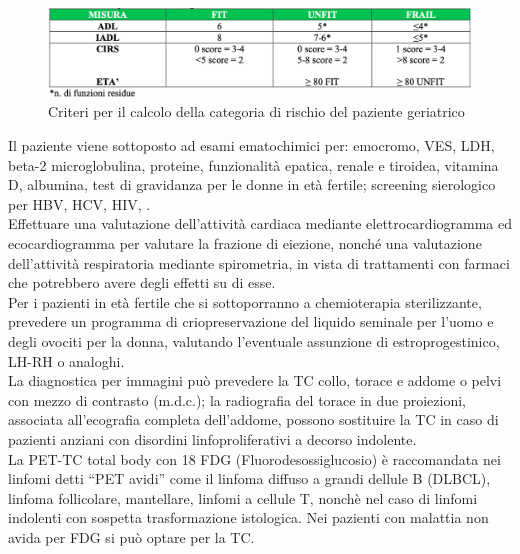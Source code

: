 \begin{figure}[H]
    \begin{center}
    \includegraphics[width=0.9\columnwidth]{img/FIT-UNFIT-FRAIL.png}
    \vspace{-3mm}
    \end{center}
    \caption{Criteri per il calcolo della categoria di rischio del paziente geriatrico
    \cite{AIOM}}

\end{figure}

Il paziente viene sottoposto ad esami ematochimici per: emocromo, VES, LDH, beta-2 microglobulina, proteine, 
funzionalità epatica, renale e tiroidea, vitamina D, albumina, test di gravidanza per le donne in età fertile; 
screening sierologico per HBV, HCV, HIV\cite{AIOM}, \cite{reteveneta}.\\
Effettuare una valutazione dell’attività cardiaca mediante elettrocardiogramma ed ecocardiogramma per valutare 
la frazione di eiezione, nonché una valutazione dell’attività respiratoria mediante spirometria, in vista di 
trattamenti con farmaci che potrebbero avere degli effetti su di esse\cite{AIOM}.\\ 
Per i pazienti in età fertile che si sottoporranno a chemioterapia sterilizzante, prevedere un programma di 
criopreservazione del liquido seminale per l’uomo e degli ovociti per la donna, valutando l’eventuale assunzione di 
estroprogestinico, LH-RH o analoghi\cite{AIOM}.\\

La diagnostica per immagini può prevedere la TC collo, torace e addome o pelvi con mezzo di contrasto (m.d.c.); 
la radiografia del torace in due proiezioni, associata all’ecografia completa dell’addome, possono sostituire 
la TC in caso di pazienti anziani con disordini linfoproliferativi a decorso indolente.\\
La PET-TC total body con 18 FDG (Fluorodesossiglucosio) è raccomandata nei linfomi detti “PET avidi” come il linfoma diffuso 
a grandi dellule B (DLBCL), linfoma follicolare, mantellare, linfomi a cellule T, nonchè nel caso di linfomi indolenti 
con sospetta trasformazione istologica. Nei pazienti con malattia non avida per FDG si può optare per la TC\cite{reteveneta}.\\ 

